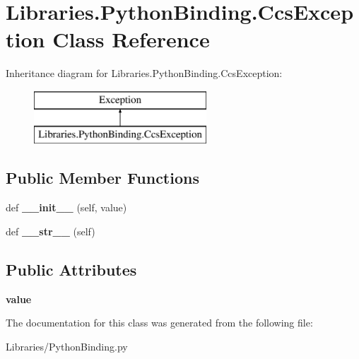 \hypertarget{class_libraries_1_1_python_binding_1_1_ccs_exception}{}\section{Libraries.\+Python\+Binding.\+Ccs\+Exception Class Reference}
\label{class_libraries_1_1_python_binding_1_1_ccs_exception}
Inheritance diagram for Libraries.\+Python\+Binding.\+Ccs\+Exception\+:\begin{figure}[H]
\begin{center}
\leavevmode
\includegraphics[height=2.000000cm]{class_libraries_1_1_python_binding_1_1_ccs_exception}
\end{center}
\end{figure}
\subsection*{Public Member Functions}
\begin{DoxyCompactItemize}
\item 
def {\bfseries \+\_\+\+\_\+init\+\_\+\+\_\+} (self, value)\hypertarget{class_libraries_1_1_python_binding_1_1_ccs_exception_a96e7570a3a67283bf71a01b40d983e85}{}\label{class_libraries_1_1_python_binding_1_1_ccs_exception_a96e7570a3a67283bf71a01b40d983e85}

\item 
def {\bfseries \+\_\+\+\_\+str\+\_\+\+\_\+} (self)\hypertarget{class_libraries_1_1_python_binding_1_1_ccs_exception_a8cf06b8adeccc2a19e1224b73e0c5fda}{}\label{class_libraries_1_1_python_binding_1_1_ccs_exception_a8cf06b8adeccc2a19e1224b73e0c5fda}

\end{DoxyCompactItemize}
\subsection*{Public Attributes}
\begin{DoxyCompactItemize}
\item 
{\bfseries value}\hypertarget{class_libraries_1_1_python_binding_1_1_ccs_exception_a0935faec2108f20f4fdcda7ce0f6a80c}{}\label{class_libraries_1_1_python_binding_1_1_ccs_exception_a0935faec2108f20f4fdcda7ce0f6a80c}

\end{DoxyCompactItemize}


The documentation for this class was generated from the following file\+:\begin{DoxyCompactItemize}
\item 
Libraries/Python\+Binding.\+py\end{DoxyCompactItemize}
